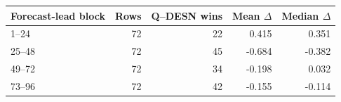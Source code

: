 \begin{tabular}{lrrrr}
\toprule
Forecast-lead block & Rows & Q--DESN wins & Mean $\Delta$ & Median $\Delta$ \\
\midrule
1--24 & 72 & 22 & 0.415 & 0.351 \\
25--48 & 72 & 45 & -0.684 & -0.382 \\
49--72 & 72 & 34 & -0.198 & 0.032 \\
73--96 & 72 & 42 & -0.155 & -0.114 \\
\bottomrule
\end{tabular}
